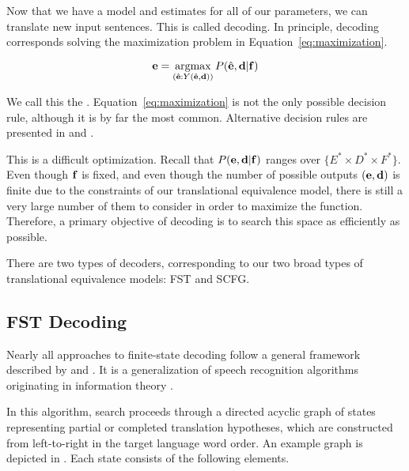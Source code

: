 Now that we have a model and estimates for all of our parameters, 
we can translate new input sentences.  This is called decoding.  
In principle, decoding corresponds solving the maximization problem
in Equation~\ref{eq:maximization}.

\begin{equation}\label{eq:maximization}
\evar = \argmax_{(\hat{\evar}:Y(\hat{\evar},\dvar))} P(\hat{\e},\dvar|\f)
\end{equation}

\noindent We call this the .  Equation~\ref{eq:maximization}
is not the only possible decision rule, although it is by far
the most common. Alternative decision rules are presented in
\citet{Kumar:2004:hlt} and \citet{Venugopal:2005:wpt}.

This is a difficult optimization.
Recall that $P({\bf e},{\bf d}|{\bf f})$ ranges over $\{E^* \times D^* \times F^*\}$.  Even
though ${\bf f}$ is fixed, and even though the number of
possible outputs $({\bf e},{\bf d})$ is finite due to the 
constraints of our translational equivalence model,
there is still a very large number of them to
consider in order to maximize the function.
Therefore, a primary objective of decoding is
to search this space as efficiently as possible.

There are two types of decoders, corresponding to 
our two broad types of translational equivalence
models: FST and SCFG.

\subsection{FST Decoding}\label{sec:finite-state-decoding}

Nearly all approaches to finite-state decoding follow
a general framework described by \citet{Wang:1997:acl} and
\citep{Koehn:2004:amta}.  It is a generalization of speech
recognition algorithms originating in information 
theory \citet{Jelinek:1969:tr}.

In this algorithm, search proceeds through a directed
acyclic graph of 
states representing partial or completed translation
hypotheses, which are constructed from left-to-right in 
the target language word order.  An example graph
is depicted in .
Each state consists of the following elements.


